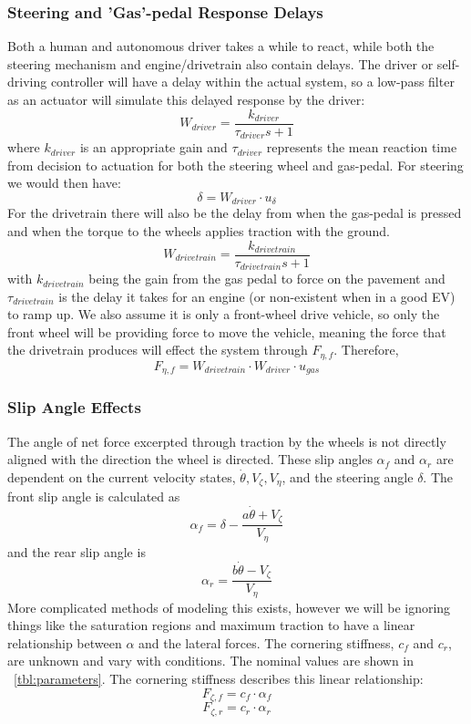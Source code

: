 \documentclass[conference, onecolumn]{IEEEtran}
\begin{document}
\subsubsection{Steering and 'Gas'-pedal Response Delays}
Both a human and autonomous driver takes a while to react, while both the steering mechanism and engine/drivetrain also contain delays. 
The driver or self-driving controller will have a delay within the actual system, so a low-pass filter as an actuator will simulate this delayed response by the driver:\[
    W_{driver} = \frac{k_{driver}}{\tau_{driver} s + 1}
\] where $k_{driver}$ is an appropriate gain and $\tau_{driver}$ represents the mean reaction time from decision to actuation for both the steering wheel and gas-pedal.
For steering we would then have:\[
    \delta = W_{driver} \cdot u_{\delta}
\] For the drivetrain there will also be the delay from when the gas-pedal is pressed and when the torque to the wheels applies traction with the ground. \[
    W_{drivetrain} =  \frac{k_{drivetrain}}{\tau_{drivetrain} s + 1}
\] with $k_{drivetrain}$ being the gain from the gas pedal to force on the pavement and $\tau_{drivetrain}$ is the delay it takes for an engine (or non-existent when in a good EV) to ramp up.
We also assume it is only a front-wheel drive vehicle, so only the front wheel will be providing force to move the vehicle, meaning the force that the drivetrain produces will effect the system through $F_{\eta,f}$. 
Therefore, \[
    F_{\eta,f} = W_{drivetrain} \cdot W_{driver} \cdot u_{gas}
\]

\subsubsection{Slip Angle Effects}
The angle of net force excerpted through traction by the wheels is not directly aligned with the direction the wheel is directed. 
These slip angles $\alpha_f$ and $\alpha_r$ are dependent on the current velocity states, $\dot{\theta}, V_{\zeta}, V_{\eta}$, and the steering angle $\delta$.
The front slip angle is calculated as\[
    \alpha_f = \delta - \frac{a \dot{\theta} + V_{\zeta}}{V_{\eta}}
\] and the rear slip angle is \[
    \alpha_r = \frac{b \dot{\theta} - V_{\zeta}}{V_{\eta}}
\]
More complicated methods of modeling this exists, however we will be ignoring things like the saturation regions and maximum traction to have a linear relationship between $\alpha$ and the lateral forces.
The cornering stiffness, $c_f$ and $c_r$, are unknown and vary with conditions. 
The nominal values are shown in \tablename \ \ref{tbl:parameters}. 
The cornering stiffness describes this linear relationship:\[
    F_{\zeta,f} = c_f \cdot \alpha_f
\] \[
    F_{\zeta,r} = c_r \cdot \alpha_r
\]
\end{document}
